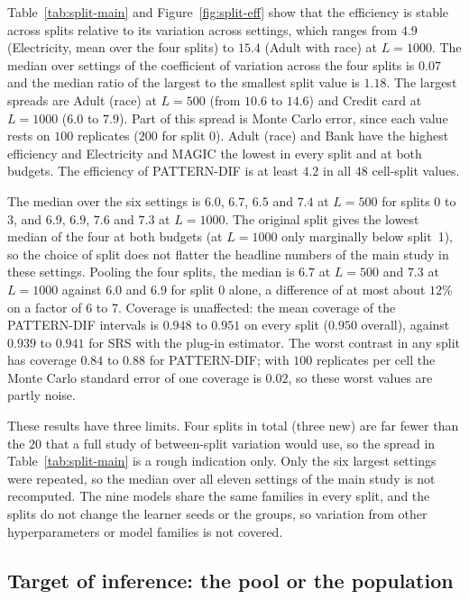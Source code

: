 \documentclass[pdflatex,sn-mathphys-num,iicol]{sn-jnl}
\theoremstyle{thmstyleone}
\theoremstyle{thmstyletwo}
\theoremstyle{thmstylethree}
\begin{document}
Table~\ref{tab:split-main} and Figure~\ref{fig:split-eff} show that the efficiency is stable across splits relative to its variation across settings, which ranges from $4.9$ (Electricity, mean over the four splits) to $15.4$ (Adult with race) at $L=1000$. The median over settings of the coefficient of variation across the four splits is $0.07$ and the median ratio of the largest to the smallest split value is $1.18$. The largest spreads are Adult (race) at $L=500$ (from $10.6$ to $14.6$) and Credit card at $L=1000$ ($6.0$ to $7.9$). Part of this spread is Monte Carlo error, since each value rests on $100$ replicates ($200$ for split $0$). Adult (race) and Bank have the highest efficiency and Electricity and MAGIC the lowest in every split and at both budgets. The efficiency of PATTERN-DIF is at least $4.2$ in all $48$ cell-split values.

The median over the six settings is $6.0$, $6.7$, $6.5$ and $7.4$ at $L=500$ for splits $0$ to $3$, and $6.9$, $6.9$, $7.6$ and $7.3$ at $L=1000$. The original split gives the lowest median of the four at both budgets (at $L=1000$ only marginally below split~1), so the choice of split does not flatter the headline numbers of the main study in these settings. Pooling the four splits, the median is $6.7$ at $L=500$ and $7.3$ at $L=1000$ against $6.0$ and $6.9$ for split $0$ alone, a difference of at most about $12\%$ on a factor of 6 to 7. Coverage is unaffected: the mean coverage of the PATTERN-DIF intervals is $0.948$ to $0.951$ on every split ($0.950$ overall), against $0.939$ to $0.941$ for SRS with the plug-in estimator. The worst contrast in any split has coverage $0.84$ to $0.88$ for PATTERN-DIF; with $100$ replicates per cell the Monte Carlo standard error of one coverage is $0.02$, so these worst values are partly noise.

These results have three limits. Four splits in total (three new) are far fewer than the $20$ that a full study of between-split variation would use, so the spread in Table~\ref{tab:split-main} is a rough indication only. Only the six largest settings were repeated, so the median over all eleven settings of the main study is not recomputed. The nine models share the same families in every split, and the splits do not change the learner seeds or the groups, so variation from other hyperparameters or model families is not covered.

\subsection{Target of inference: the pool or the population}\label{sec:population}
\end{document}
